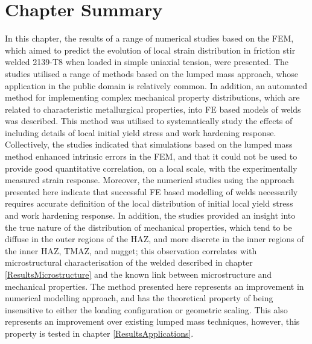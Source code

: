 \section{Chapter Summary}
\label{SMDSummary}
In this chapter, the results of a range of numerical studies based on the FEM, which aimed to predict the evolution of local strain distribution in friction stir welded 2139-T8 when loaded in simple uniaxial tension, were presented. The studies utilised a range of methods based on the lumped mass approach, whose application in the public domain is relatively common. In addition, an automated method for implementing complex mechanical property distributions, which are related to characteristic metallurgical properties, into FE based models of welds was described. This method was utilised to systematically study the effects of including details of local initial yield stress and work hardening response. Collectively, the studies indicated that simulations based on the lumped mass method enhanced intrinsic errors in the FEM, and that it could not be used to provide good quantitative correlation, on a local scale, with the experimentally measured strain response. Moreover, the numerical studies using the approach presented here indicate that successful FE based modelling of welds necessarily requires accurate definition of the local distribution of initial local yield stress and work hardening response. In addition, the studies provided an insight into the true nature of the distribution of mechanical properties, which tend to be diffuse in the outer regions of the HAZ, and more discrete in the inner regions of the inner HAZ, TMAZ, and nugget; this observation correlates with microstructural characterisation of the welded described in chapter \ref{ResultsMicrostructure} and the known link between microstructure and mechanical properties. The method presented here represents an improvement in numerical modelling approach, and has the theoretical property of being insensitive to either the loading configuration or geometric scaling. This also represents an improvement over existing lumped mass techniques, however, this property is tested in chapter \ref{ResultsApplications}.
